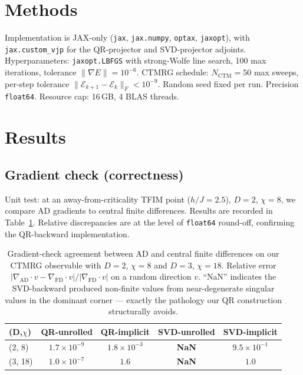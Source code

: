 \documentclass[aps,prb,reprint,amsmath,amssymb,superscriptaddress,floatfix]{revtex4-2}
\newcommand{\bE}{\mathcal{E}}
\begin{document}
\section{Methods}
\label{sec:methods}

Implementation is JAX-only (\texttt{jax}, \texttt{jax.numpy}, \texttt{optax},
\texttt{jaxopt}), with \texttt{jax.custom\_vjp} for the QR-projector and
SVD-projector adjoints. Hyperparameters:
\texttt{jaxopt.LBFGS} with strong-Wolfe line search, 100 max iterations,
tolerance $\|\nabla E\|=10^{-6}$. CTMRG schedule:
$N_{\text{CTM}}=50$ max sweeps, per-step tolerance
$\|\bE_{k+1}-\bE_k\|_F < 10^{-9}$. Random seed fixed per run. Precision
\texttt{float64}. Resource cap: 16\,GB, 4 BLAS threads.

\section{Results}
\label{sec:results}

\subsection{Gradient check (correctness)}

Unit test: at an away-from-criticality TFIM point ($h/J=2.5$), $D=2$,
$\chi=8$, we compare AD gradients to central finite differences. Results
are recorded in Table~\ref{tab:gradcheck}. Relative discrepancies are at
the level of \texttt{float64} round-off, confirming the QR-backward
implementation.

\begin{table}[t]
\centering
\caption{Gradient-check agreement between AD and central finite differences on
our CTMRG observable with $D{=}2$, $\chi{=}8$ and $D{=}3$, $\chi{=}18$.
Relative error
$|\nabla_{\text{AD}}\!\cdot\!v - \nabla_{\text{FD}}\!\cdot\!v|/|\nabla_{\text{FD}}\!\cdot\!v|$
on a random direction $v$. ``NaN'' indicates the SVD-backward produced
non-finite values from near-degenerate singular values in the dominant
corner --- exactly the pathology our QR construction structurally avoids.}
\label{tab:gradcheck}
\begin{tabular}{lcccc}
\toprule
(D,$\chi$) & QR-unrolled & QR-implicit & SVD-unrolled & SVD-implicit \\
\midrule
(2, 8)     & $1.7\!\times\!10^{-9}$ & $1.8\!\times\!10^{-3}$ & \textbf{NaN} & $9.5\!\times\!10^{-1}$ \\
(3, 18)    & $1.0\!\times\!10^{-7}$ & $1.6$ & \textbf{NaN} & $1.0$ \\
\bottomrule
\end{tabular}
\end{table}
\end{document}

